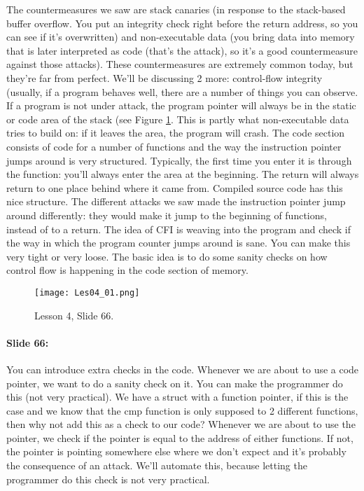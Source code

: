 \documentclass[10pt,a4paper]{report}
\begin{document}
The countermeasures we saw are stack canaries (in response to the stack-based buffer overflow. You put an integrity check right before the return address, so you can see if it's overwritten) and non-executable data (you bring data into memory that is later interpreted as code (that's the attack), so it's a good countermeasure against those attacks). These countermeasures are extremely common today, but they're far from perfect. We'll be discussing 2 more: control-flow integrity (usually, if a program behaves well, there are a number of things you can observe. If a program is not under attack, the program pointer will always be in the static or code area of the stack (see Figure \ref{les04_01}. This is partly what non-executable data tries to build on: if it leaves the area, the program will crash. The code section consists of code for a number of functions and the way the instruction pointer jumps around is very structured. Typically, the first time you enter it is through the function: you'll always enter the area at the beginning. The return will always return to one place behind where it came from. Compiled source code has this nice structure. The different attacks we saw made the instruction pointer jump around differently: they would make it jump to the beginning of functions, instead of to a return. The idea of CFI is weaving into the program and check if the way in which the program counter jumps around is sane. You can make this very tight or very loose. The basic idea is to do some sanity checks on how control flow is happening in the code section of memory.

\begin{figure}[ht!]
\centering
\texttt{[image: Les04\_01.png]}
\caption{Lesson 4, Slide 66.} 
\label{les04_01}
\end{figure}

\paragraph{Slide 66:} You can introduce extra checks in the code. Whenever we are about to use a code pointer, we want to do a sanity check on it. You can make the programmer do this (not very practical). We have a struct with a function pointer, if this is the case and we know that the cmp function is only supposed to 2 different functions, then why not add this as a check to our code? Whenever we are about to use the pointer, we check if the pointer is equal to the address of either functions. If not, the pointer is pointing somewhere else where we don't expect and it's probably the consequence of an attack. We'll automate this, because letting the programmer do this check is not very practical. 
\end{document}

